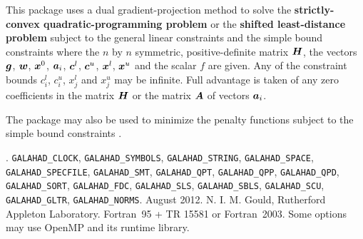 \documentclass{galahad}
\newcommand{\packagename}{DQP}
\newcommand{\fullpackagename}{\libraryname\_\packagename}
\begin{document}
\galheader


\galsummary
This package uses a dual gradient-projection method
to solve the {\bf strictly-convex quadratic-programming problem}
or the {\bf shifted least-distance problem}
subject to the general linear constraints
and the simple bound constraints
where the $n$ by $n$ symmetric, positive-definite matrix ${\bm{H}}$, the
vectors ${\bm{g}}$, ${\bm{w}}$, ${\bm{x}}^{0}$,
${\bm{a}}_{i}$, ${\bm{c}}^{l}$, ${\bm{c}}^{u}$, ${\bm{x}}^{l}$,
${\bm{x}}^{u}$ and the scalar $f$ are given.
Any of the constraint bounds $c_{i}^{l}$, $c_{i}^{u}$,
$x_{j}^{l}$ and $x_{j}^{u}$ may be infinite.
Full advantage is taken of any zero coefficients in the matrix ${\bm{H}}$
or the matrix ${\bm{A}}$ of vectors ${\bm{a}}_{i}$.

The package may also be used to minimize the penalty functions
subject to the simple bound constraints .



\galattributes
\galversions{\tt  \fullpackagename\_single, \fullpackagename\_double}.
\galuses
{\tt GALAHAD\_CLOCK},
{\tt GALAHAD\_SY\-M\-BOLS},
{\tt GALAHAD\-\_STRING},
{\tt GALAHAD\-\_SPACE},
{\tt GALAHAD\_SPECFILE},
{\tt GALAHAD\_SMT},
{\tt GALAHAD\_QPT},
{\tt GALAHAD\_QPP},
{\tt GALAHAD\_\-QPD},
{\tt GALAHAD\_\-SORT},
{\tt GALAHAD\_\-FDC},
{\tt GALAHAD\_\-SLS},
{\tt GALAHAD\_\-SBLS},
{\tt GALAHAD\_\-SCU},
{\tt GALAHAD\_\-GLTR},
{\tt GALAHAD\_NORMS}.
\galdate August 2012.
\galorigin N. I. M. Gould, Rutherford Appleton Laboratory.
\gallanguage Fortran~95 + TR 15581 or Fortran~2003.
\galparallelism Some options may use OpenMP and its runtime library.

\end{document}
